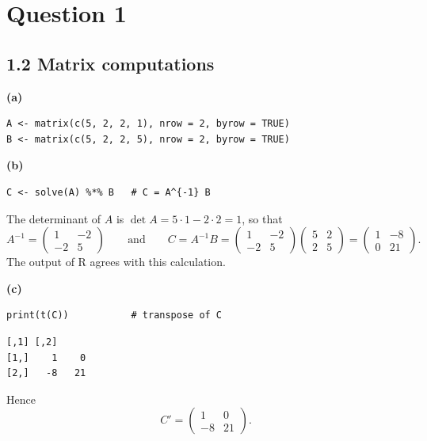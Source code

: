 \documentclass{HW} %
\begin{document}
\maketitle

\section*{Question 1}

\subsection*{1.2 Matrix computations}

\noindent\textbf{(a)}

\begin{lstlisting}
A <- matrix(c(5, 2, 2, 1), nrow = 2, byrow = TRUE)
B <- matrix(c(5, 2, 2, 5), nrow = 2, byrow = TRUE)
\end{lstlisting}

\medskip
\noindent\textbf{(b)}

\begin{lstlisting}
C <- solve(A) %*% B   # C = A^{-1} B
\end{lstlisting}
The determinant of $A$ is $\det A = 5 \cdot 1 - 2 \cdot 2 = 1$, so that
\[ A^{-1} = \begin{pmatrix} 1 & -2 \\ -2 & 5 \end{pmatrix} \qquad \text{and} \qquad C = A^{-1}B = \begin{pmatrix} 1 & -2 \\ -2 & 5 \end{pmatrix} \begin{pmatrix} 5 & 2 \\ 2 & 5 \end{pmatrix} = \begin{pmatrix} 1 & -8 \\ 0 & 21 \end{pmatrix}. \]
The output of R agrees with this calculation.

\medskip
\noindent\textbf{(c)}

\begin{lstlisting}
print(t(C))           # transpose of C
\end{lstlisting}
\begin{lstlisting}[style=routput]
     [,1] [,2]
[1,]    1    0
[2,]   -8   21
\end{lstlisting}
Hence
\[ C' = \begin{pmatrix} 1 & 0 \\ -8 & 21 \end{pmatrix}. \]
\end{document}
